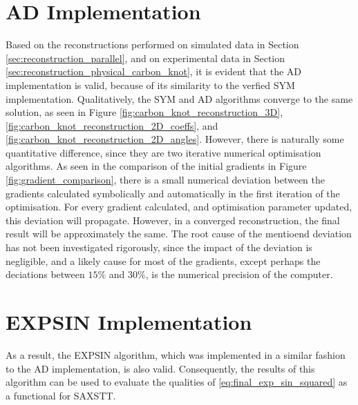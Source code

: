 

\section{AD Implementation}\label{sec:ad_validation}
Based on the reconstructions performed on simulated data in Section \ref{sec:reconstruction_parallel},
and on experimental data in Section \ref{sec:reconstruction_physical_carbon_knot},
it is evident that the AD implementation is valid, because of its similarity to the verfied SYM implementation.
Qualitatively, the SYM and AD algorithms converge to the same solution, as seen in Figure \ref{fig:carbon_knot_reconstruction_3D}, \ref{fig:carbon_knot_reconstruction_2D_coeffs}, and \ref{fig:carbon_knot_reconstruction_2D_angles}.
However, there is naturally some quantitative difference, since they are two iterative numerical optimisation algorithms.
As seen in the comparison of the initial gradients in Figure \ref{fig:gradient_comparison},
there is a small numerical deviation between the gradients calculated symbolically and automatically in the first iteration of the optimisation.
For every gradient calculated, and optimisation parameter updated, this deviation will propagate. However, in a converged reconstruction,
the final result will be approximately the same.
The root cause of the mentioend deviation has not been investigated rigorously, since the impact of the deviation is negligible,
and a likely cause for most of the gradients, except perhaps the deciations between $15\%$ and $30\%$, is the numerical precision of the computer.


\section{EXPSIN Implementation}\label{sec:saxstt_validation}
As a result, the EXPSIN algorithm, which was implemented in a similar fashion to the AD implementation, is also valid.
Consequently, the results of this algorithm can be used to evaluate the qualities of \eqref{eq:final_exp_sin_squared} as a functional for SAXSTT.

